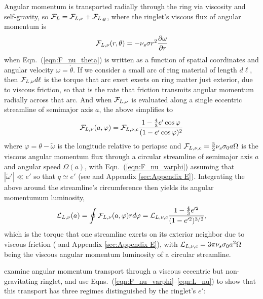 \documentclass[preprint]{aastex62}
\begin{document}
Angular momentum is transported radially through the ring via viscosity and self-gravity, 
so ${\cal F}_L={\cal F}_{L,\nu} + {\cal F}_{L,g}$,
where the ringlet's viscous flux of angular momentum is
\begin{equation}
    {\cal F}_{L,\nu}(r, \theta) = -\nu_s \sigma r^2\frac{\partial\omega}{\partial r}
\end{equation}
when Eqn.\ (\ref{eqn:F_nu_theta}) is written as a function of spatial coordinates and
angular velocity $\omega=\dot{\theta}$. 
If we consider a small arc of  ring material of length $d\ell$, 
then ${\cal F}_{L,\nu}d\ell$ is the torque that arc exert exerts on
ring matter just exterior, due to viscous friction,
so that is the rate that friction transmits angular momentum radially across that arc.
And when ${\cal F}_{L,\nu}$ is evaluated along a single eccentric streamline of semimajor axis $a$, 
the above simplifies to
\begin{equation}
    \label{eqn:F_nu_varphi}
    {\cal F}_{L,\nu}(a, \varphi) = {\cal F}_{L,\nu,c}\frac{1-\frac{4}{3}e'\cos\varphi}{(1-e'\cos\varphi)^2}
\end{equation}
where $\varphi=\theta-\tilde{\omega}$ is the longitude relative to periapse
and ${\cal F}_{L,\nu,c}=\frac{3}{2}\nu_s\sigma_0a\Omega$ is the viscous angular momentum flux through a
circular streamline of semimajor axis $a$ and angular speed $\Omega(a)$,
with Eqn.\ (\ref{eqn:F_nu_varphi}) assuming  that
$|\tilde{\omega}'|\ll e'$ so that $q\simeq e'$
(see \citealt{BGT82} and Appendix \ref{sec:Appendix E}). Integrating the above
around the streamline's circumference then yields its angular momentumum luminosity,
\begin{equation}
    \label{eqn:L_nu}
    {\cal L}_{L,\nu}(a) = \oint {\cal F}_{L,\nu}(a, \varphi)rd\varphi = {\cal L}_{L,\nu,c}\frac{1-\frac{4}{3}e'^2}{(1-e'^2)^{3/2}},
\end{equation}
which is the torque that one streamline exerts on its exterior neighbor due to viscous friction
(\citealt{BGT82} and Appendix \ref{sec:Appendix E}),
with ${\cal L}_{L,\nu,c}=3\pi\nu_s\sigma_0a^2\Omega$
being the viscous angular momentum luminosity of a circular streamline.

\citet{BGT82} examine angular momentum transport through a viscous eccentric but non-gravitating ringlet, 
and use Eqns.\ (\ref{eqn:F_nu_varphi}--\ref{eqn:L_nu}) to show that this transport has three 
regimes distinguished by the ringlet's $e'$:
\end{document}
